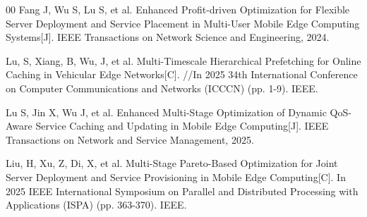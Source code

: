 \documentclass[10pt, conference, letterpaper]{IEEEtran}
\begin{document}
\begin{thebibliography}{00}
 Fang J, Wu S, Lu S, et al. Enhanced Profit-driven Optimization for Flexible Server Deployment and Service Placement in Multi-User Mobile Edge Computing Systems[J]. IEEE Transactions on Network Science and Engineering, 2024.

 Lu, S, Xiang, B, Wu, J, et al. Multi-Timescale Hierarchical Prefetching for Online Caching in Vehicular Edge Networks[C]. //In 2025 34th International Conference on Computer Communications and Networks (ICCCN) (pp. 1-9). IEEE.

 Lu S, Jin X, Wu J, et al. Enhanced Multi-Stage Optimization of Dynamic QoS-Aware Service Caching and Updating in Mobile Edge Computing[J]. IEEE Transactions on Network and Service Management, 2025.

 Liu, H, Xu, Z, Di, X, et al. Multi-Stage Pareto-Based Optimization for Joint Server Deployment and Service Provisioning in Mobile Edge Computing[C]. In 2025 IEEE International Symposium on Parallel and Distributed Processing with Applications (ISPA) (pp. 363-370). IEEE.


\end{thebibliography}
\end{document}
